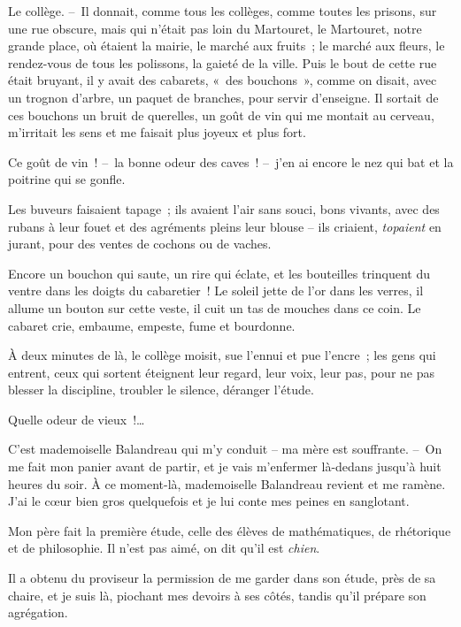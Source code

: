 \documentclass[french,twoside]{book} %
\begin{document}
\noindent Le collège. – Il donnait, comme tous les collèges, comme toutes les prisons, sur une rue obscure, mais qui n’était pas loin du Martouret, le Martouret, notre grande place, où étaient la mairie, le marché aux fruits ; le marché aux fleurs, le rendez-vous de tous les polissons, la gaieté de la ville. Puis le bout de cette rue était bruyant, il y avait des cabarets, « des bouchons », comme on disait, avec un trognon d’arbre, un paquet de branches, pour servir d’enseigne. Il sortait de ces bouchons un bruit de querelles, un goût de vin qui me montait au cerveau, m’irritait les sens et me faisait plus joyeux et plus fort.\par
Ce goût de vin ! – la bonne odeur des caves ! – j’en ai encore le nez qui bat et la poitrine qui se gonfle.\par
Les buveurs faisaient tapage ; ils avaient l’air sans souci, bons vivants, avec des rubans à leur fouet et des agréments pleins leur blouse – ils criaient, \emph{topaient} en jurant, pour des ventes de cochons ou de vaches.\par
Encore un bouchon qui saute, un rire qui éclate, et les bouteilles trinquent du ventre dans les doigts du cabaretier ! Le soleil jette de l’or dans les verres, il allume un bouton sur cette veste, il cuit un tas de mouches dans ce coin. Le cabaret crie, embaume, empeste, fume et bourdonne.\par
\bigbreak
\noindent À deux minutes de là, le collège moisit, sue l’ennui et pue l’encre ; les gens qui entrent, ceux qui sortent éteignent leur regard, leur voix, leur pas, pour ne pas blesser la discipline, troubler le silence, déranger l’étude.\par
Quelle odeur de vieux !…\par
\bigbreak
\noindent C’est mademoiselle Balandreau qui m’y conduit – ma mère est souffrante. – On me fait mon panier avant de partir, et je vais m’enfermer là-dedans jusqu’à huit heures du soir. À ce moment-là, mademoiselle Balandreau revient et me ramène. J’ai le cœur bien gros quelquefois et je lui conte mes peines en sanglotant.\par
\bigbreak
\noindent Mon père fait la première étude, celle des élèves de mathématiques, de rhétorique et de philosophie. Il n’est pas aimé, on dit qu’il est \emph{chien}.\par
Il a obtenu du proviseur la permission de me garder dans son étude, près de sa chaire, et je suis là, piochant mes devoirs à ses côtés, tandis qu’il prépare son agrégation.\par
\end{document}
